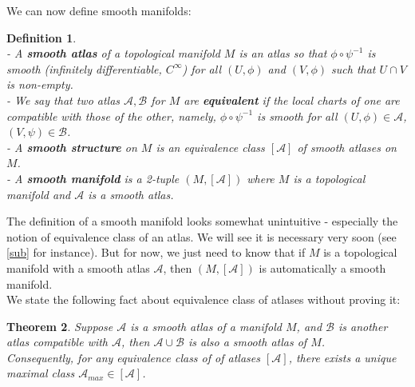 \documentclass[11pt]{article}
\newtheorem{theorem}{Theorem}[section]
\newtheorem{definition}[theorem]{Definition}
\newcommand{\mc}[1]{\mathcal{#1}}
\begin{document}
We can now define smooth manifolds:
\begin{definition} \mbox{}\\
- A \textbf{smooth atlas} of a topological manifold $M$ is an atlas so that $\phi \circ \psi^{-1}$ is smooth (infinitely differentiable, $C^{\infty}$) for all $(U,\phi)$ and $(V,\phi)$ such that $U \cap V$ is non-empty.\\
- We say that two atlas $\mc{A}, \mc{B}$ for $M$ are \textbf{equivalent} if the local charts of one are compatible with those of the other, namely, $\phi \circ \psi^{-1}$ is smooth for all $(U, \phi) \in \mc{A}$, $(V, \psi) \in \mc{B}$. \\
- A \textbf{smooth structure} on $M$ is an equivalence class $[\mc{A}]$ of smooth atlases on $M$.\\
- A \textbf{smooth manifold} is a 2-tuple $(M,[\mathcal{A}])$ where $M$ is a topological manifold and $\mathcal{A}$ is a smooth atlas.
\end{definition}
The definition of a smooth manifold looks somewhat unintuitive - especially the notion of equivalence class of an atlas. We will see it is necessary very soon (see \ref{sub} for instance). But for now, we just need to know that if $M$ is a topological manifold with a smooth atlas $\mc{A}$, then $(M, [\mc{A}])$ is automatically a smooth manifold.\\
We state the following fact about equivalence class of atlases without proving it:
\begin{theorem}
Suppose $\mc{A}$ is a smooth atlas of a manifold $M$, and $\mc{B}$ is another atlas compatible with $\mc{A}$, then $\mc{A} \cup \mc{B}$ is also a smooth atlas of $M$.\\
Consequently, for any equivalence class of of atlases $[\mc{A}]$, there exists a unique maximal class $\mc{A}_{max} \in [\mc{A}]$.
\end{theorem}
\end{document}
